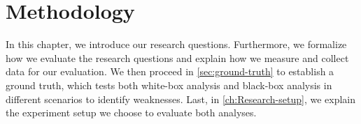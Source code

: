 \chapter{Methodology}\label{ch:methodology}

In this chapter, we introduce our research questions. 
Furthermore, we formalize how we evaluate the research questions and explain how we measure and collect data for our evaluation.
We then proceed in \autoref{sec:ground-truth} to establish a ground truth, which tests both white-box analysis and black-box analysis in 
different scenarios to identify weaknesses. Last, in \autoref{ch:Research-setup}, we explain the experiment setup we choose to evaluate both analyses.



